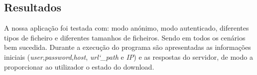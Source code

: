 \subsection*{Resultados}
A nossa aplicação foi testada com: modo anónimo, modo autenticado, diferentes tipos de ficheiro e diferentes tamanhos de ficheiros. Sendo em todos os cenários bem sucedida.
Durante a execução do programa são apresentadas as informações iniciais (\textit{user},\textit{password},\textit{host}, \textit{url\char`_path} e \textit{IP}) e as respostas do servidor, de modo a proporcionar ao utilizador o estado do download. 